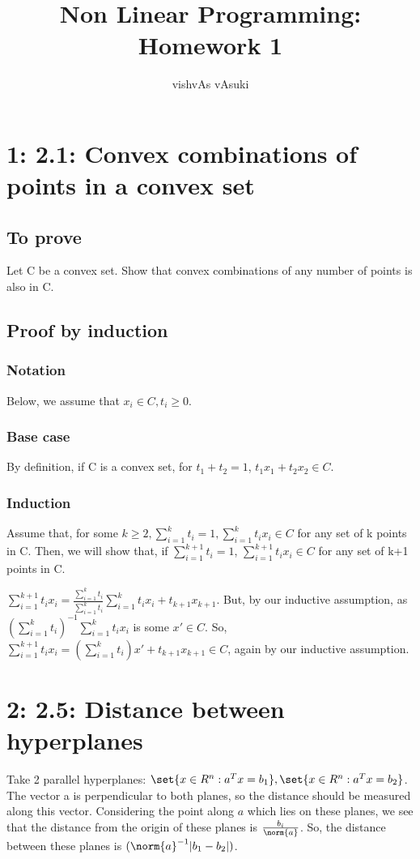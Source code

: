 \documentclass{article}
\title{Non Linear Programming: Homework 1}
\author{vishvAs vAsuki}
\begin{document}
\maketitle

\section{1: 2.1: Convex combinations of points in a convex set}
\subsection{To prove}
Let C be a convex set. Show that convex combinations of any number of points is also in C.

\subsection{Proof by induction}
\subsubsection{Notation}
Below, we assume that $x_i\in C, t_i \geq 0$.

\subsubsection{Base case}
By definition, if C is a convex set, for $t_1 + t_2 = 1$, $t_1 x_1 + t_2 x_2 \in C$.

\subsubsection{Induction}
Assume that, for some $k \geq 2, \sum_{i=1}^{k} t_i = 1, \sum_{i=1}^{k}t_ix_i \in C$ for any set of k points in C. Then, we will show that, if $\sum_{i=1}^{k+1} t_i = 1$, $\sum_{i=1}^{k+1}t_ix_i \in C$ for any set of k+1 points in C.

$\sum_{i=1}^{k+1}t_ix_i  = \frac{\sum_{i=1}^{k}t_i}{\sum_{i=1}^{k}t_i}\sum_{i=1}^{k}t_ix_i + t_{k+1}x_{k+1}$. But, by our inductive assumption, as  $(\sum_{i=1}^{k}t_i)^{-1}\sum_{i=1}^{k}t_ix_i$ is some $x' \in C $. So, $\sum_{i=1}^{k+1}t_ix_i  = (\sum_{i=1}^{k}t_i) x' + t_{k+1}x_{k+1} \in C$, again by our inductive assumption.

\section{2: 2.5: Distance between hyperplanes}
Take 2 parallel hyperplanes: $\set{x \in R^{n}: a^{T}x = b_1}, \set{x \in R^{n}: a^{T}x = b_2}$. The vector a is perpendicular to both planes, so the distance should be measured along this vector. Considering the point along $a$ which lies on these planes, we see that the distance from the origin of these planes is $\frac{b_i}{\norm{a}}$. So, the distance between these planes is $(\norm{a}^{-1}|b_1 - b_2|)$.
\end{document}
